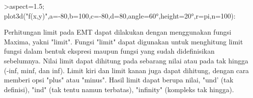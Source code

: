 \documentclass{article}
\begin{document}
\begin{eulernotebook}
\begin{eulercomment}
\begin{eulercomment}
\begin{eulerprompt}
>aspect=1.5; plot3d("f(x,y)",a=-80,b=100,c=-80,d=80,angle=60°,height=20°,r=pi,n=100):
\end{eulerprompt}
\begin{eulercomment}
Perhitungan limit pada EMT dapat dilakukan dengan menggunakan fungsi Maxima, yakni "limit".
Fungsi "limit" dapat digunakan untuk menghitung limit fungsi dalam bentuk ekspresi maupun
fungsi yang sudah didefinisikan sebelumnya. Nilai limit dapat dihitung pada sebarang nilai
atau pada tak hingga (-inf, minf, dan inf). Limit kiri dan limit kanan juga dapat dihitung,
dengan cara memberi opsi "plus" atau "minus". Hasil limit dapat berupa nilai, "und' (tak
definisi), "ind" (tak tentu namun terbatas), "infinity" (kompleks tak hingga).


\end{eulercomment}
\end{eulercomment}
\end{eulercomment}
\end{eulernotebook}
\end{document}
